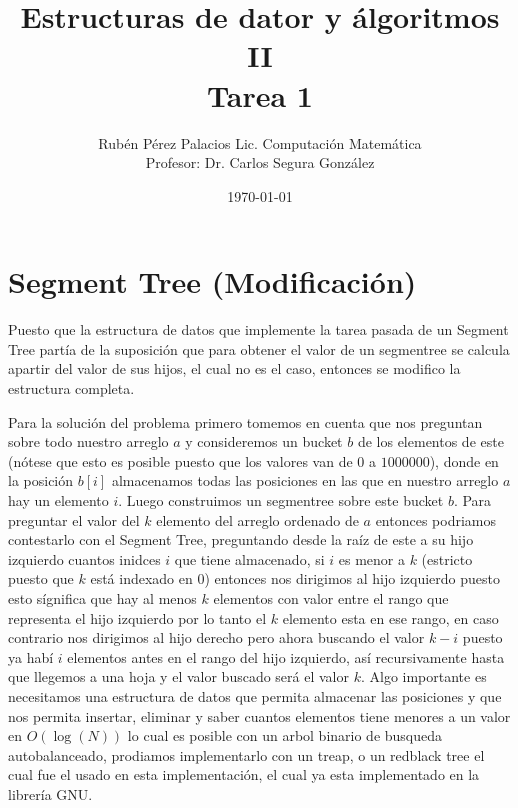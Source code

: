 \documentclass[letterpaper]{article}
\title{Estructuras de dator y álgoritmos II \\ Tarea 1}
\author{Rubén Pérez Palacios Lic. Computación Matemática\\Profesor: Dr. Carlos Segura González}
\date{\today}
\theoremstyle{definition}
\theoremstyle{lemathm}
\theoremstyle{lemathm}
\theoremstyle{lemathm}
\theoremstyle{lemademthm}
\newcommand{\1}{\mathbbm{1}}
\begin{document}
	\maketitle

	\section{Segment Tree (Modificación)}
	
	Puesto que la estructura de datos que implemente la tarea pasada de un Segment Tree partía de la suposición que para obtener el valor de un segmentree se calcula apartir del valor de sus hijos, el cual no es el caso, entonces se modifico la estructura completa.

	Para la solución del problema primero tomemos en cuenta que nos preguntan sobre todo nuestro arreglo $a$ y consideremos un bucket $b$ de los elementos de este (nótese que esto es posible puesto que los valores van de $0$ a $1000000$), donde en la posición $b[i]$ almacenamos todas las posiciones en las que en nuestro arreglo $a$ hay un elemento $i$. Luego construimos un segmentree sobre este bucket $b$. Para preguntar el valor del $k$ elemento del arreglo ordenado de $a$ entonces podriamos contestarlo con el Segment Tree, preguntando desde la raíz de este a su hijo izquierdo cuantos inidces $i$ que tiene almacenado, si $i$ es menor a $k$ (estricto puesto que $k$ está indexado en $0$) entonces nos dirigimos al hijo izquierdo puesto esto sígnifica que hay al menos $k$ elementos con valor entre el rango que representa el hijo izquierdo por lo tanto el $k$ elemento esta en ese rango, en caso contrario nos dirigimos al hijo derecho pero ahora buscando el valor $k-i$ puesto ya habí $i$ elementos antes en el rango del hijo izquierdo, así recursivamente hasta que llegemos a una hoja y el valor buscado será el valor $k$. Algo importante es necesitamos una estructura de datos que permita almacenar las posiciones y que nos permita insertar, eliminar y saber cuantos elementos tiene menores a un valor en $O(\log(N))$ lo cual es posible con un arbol binario de busqueda autobalanceado, prodiamos implementarlo con un treap, o un redblack tree el cual fue el usado en esta implementación, el cual ya esta implementado en la librería GNU.
\end{document}

